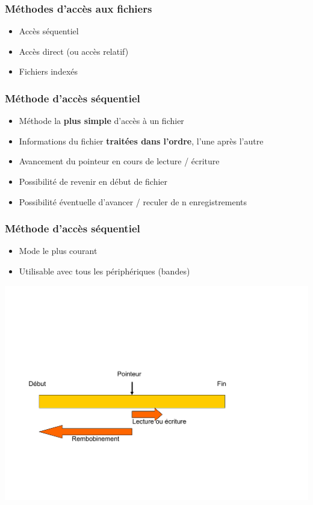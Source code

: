 \begin{frame}
\frametitle{Méthodes d'accès aux fichiers}
\begin{itemize}
\item Accès séquentiel
\item Accès direct (ou accès relatif)
\item Fichiers indexés
\end{itemize}
\end{frame}

\begin{frame}
\frametitle{Méthode d'accès séquentiel}
\begin{itemize}
\item Méthode la \textbf{plus simple} d'accès à un fichier
\item Informations du fichier \textbf{traitées dans l'ordre}, l'une après l'autre
\item Avancement du pointeur en cours de lecture / écriture
\item Possibilité de revenir en début de fichier
\item Possibilité éventuelle d'avancer / reculer de n enregistrements
\end{itemize}
\end{frame}

\begin{frame}
\frametitle{Méthode d'accès séquentiel}
\begin{itemize}
\item Mode le plus courant
\item Utilisable avec tous les périphériques (bandes)
\end{itemize}
\includegraphics[width=\textwidth]{../illustration/acces_sequentiel.pdf} 
\end{frame}

